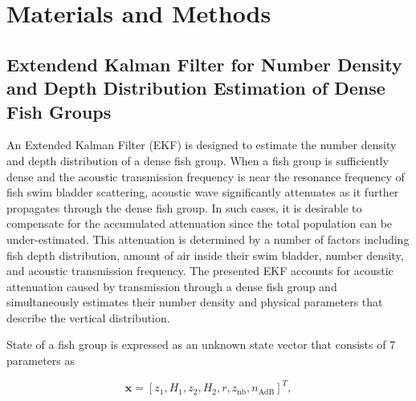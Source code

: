\documentclass[technicalnote,oneauthor,latex,dvi2pdf,10pt,a4paper]{Definitions/mdpi}
\begin{document}


\section{Materials and Methods}
\subsection{Extendend Kalman Filter for Number Density and Depth Distribution Estimation of Dense Fish Groups}
An Extended Kalman Filter (EKF) is designed to estimate the number density and depth distribution of a dense fish group.
When a fish group is sufficiently dense and the acoustic transmission frequency is near the resonance frequency of fish swim bladder scattering, acoustic wave significantly attenuates as it further propagates through the dense fish group. 
In such cases, it is desirable to compensate for the accumulated attenuation since the total population can be under-estimated.
This attenuation is determined by a number of factors including fish depth distribution, amount of air inside their swim bladder, number density, and acoustic transmission frequency.
The presented EKF accounts for acoustic attenuation caused by transmission through a dense fish group and simultaneously estimates their number density and physical parameters that describe the vertical distribution.

State of a fish group is expressed as an unknown state vector that consists of 7 parameters as

\begin{equation}
\label{eq:stateVec}
\mathbf{x} = \left[z_1, H_1, z_2, H_2, r, z_\text{nb}, n_\text{AdB}\right]^{T},
\end{equation}
\end{document}
